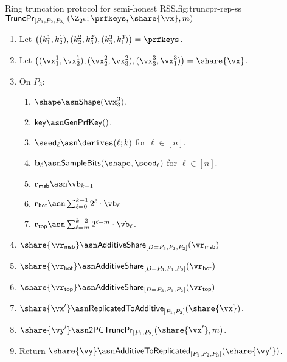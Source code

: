 \begin{Boxfig}{Ring truncation protocol for semi-honest
RSS.}{fig:truncpr-rep-ss}{$\mathsf{TruncPr}_{[P_1, P_2, P_3]} \left(\Z_{2^k}; \prfkeys, \share{\vx}, m \right)$}
\begin{enumerate}
  \item Let $\left( (k_1^1, k_2^1), (k_2^2, k_3^2), (k_3^3, k_1^3) \right) = \prfkeys$.
  
  \item Let $\left( (\vx_1^1, \vx_2^1), (\vx_2^2, \vx_3^2), (\vx_3^3, \vx_1^3) \right) = \share{\vx}$.
  
  \item On $P_3$:
  \begin{enumerate}
    \item $\shape \asn \mathsf{Shape}(\vx^3_3)$.
    \item $\mathsf{key} \asn \mathsf{GenPrfKey}()$.
    \item $\seed_\ell \asn \derives(\ell; k)$ for $\ell \in [n]$.
    \item $\mathbf{b}_\ell \asn \mathsf{SampleBits}(\shape, \seed_\ell)$ for $\ell \in [n]$.
    \item $\mathbf{r}_{\mathsf{msb}} \asn \vb_{k-1}$
    \item $\mathbf{r}_{\mathsf{bot}} \asn \sum_{\ell=0}^{k-1}2^\ell \cdot \vb_\ell$
    \item $\mathbf{r}_{\mathsf{top}} \asn \sum_{\ell=m}^{k-2} 2^{\ell-m} \cdot \vb_\ell$.
  \end{enumerate}

  \item $\share{\vr_{\mathsf{msb}}} \asn \mathsf{AdditiveShare}_{[D=P_3, P_1, P_2]}(\vr_{\mathsf{msb}})$

  \item $\share{\vr_{\mathsf{bot}}} \asn \mathsf{AdditiveShare}_{[D=P_3, P_1, P_2]}(\vr_{\mathsf{bot}})$
  
  \item $\share{\vr_{\mathsf{top}}} \asn \mathsf{AdditiveShare}_{[D=P_3, P_1, P_2]}(\vr_{\mathsf{top}})$
 
  \item $\share{\vx'} \asn \mathsf{ReplicatedToAdditive}_{[P_1, P_2]}(\share{\vx})$.

  \item $\share{\vy'} \asn \mathsf{2PCTruncPr}_{[P_1, P_2]}(\share{\vx'}, m)$.

  \item Return $\share{\vy} \asn \mathsf{AdditiveToReplicated}_{[P_1, P_2, P_3]}(\share{\vy'})$.


\end{enumerate}
\end{Boxfig}
